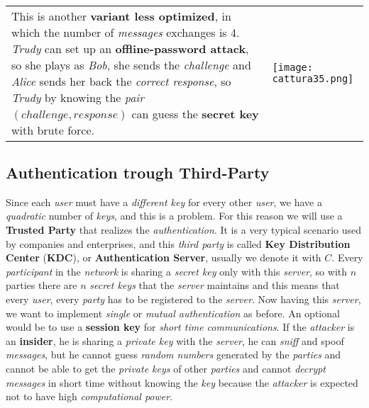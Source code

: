 \documentclass{article}
\begin{document}
\hfill \break
\\
\begin{tabular}{C{11cm}  L{10.5cm}}
This is another \textbf{variant less optimized}, in which the number of \emph{messages} exchanges is 4. \emph{Trudy} can set up an \textbf{offline-password attack}, so she plays as \emph{Bob}, she sends the \emph{challenge} and \emph{Alice} sends her back the \emph{correct response}, so \emph{Trudy} by knowing the \emph{pair} $(challenge,response)$ can guess the \textbf{secret key} with brute force.& \texttt{[image: cattura35.png]}
\end{tabular}
\clearpage
\subsection{Authentication trough Third-Party}
Since each \emph{user} must have a \emph{different key} for every other \emph{user}, we have a \emph{quadratic} number of \emph{keys}, and this is a problem. For this reason we will use a \textbf{Trusted Party} that realizes the \emph{authentication}. It is a very typical scenario used by companies and enterprises, and this \emph{third party} is called \textbf{Key Distribution Center} (\textbf{KDC}), or \textbf{Authentication Server}, usually we denote it with $C$. Every \emph{participant} in the \emph{network} is sharing a \emph{secret key} only with this \emph{server}, so with $n$ parties there are $n$ \emph{secret keys} that the \emph{server} maintains and this means that every \emph{user}, every \emph{party} has to be registered to the \emph{server}. Now having this \emph{server}, we want to implement \emph{single} or \emph{mutual authentication} as before. An optional would be to use a \textbf{session key} for \emph{short time communications}. If the \emph{attacker} is an \textbf{insider}, he is sharing a \emph{private key} with the \emph{server}, he can \emph{sniff} and spoof\emph{ messages}, but he cannot guess \emph{random numbers} generated by the \emph{parties} and cannot be able to get the \emph{private keys} of other \emph{parties} and cannot \emph{decrypt messages} in short time without knowing the \emph{key} because the \emph{attacker} is expected not to have high \emph{computational power}. 
\end{document}
